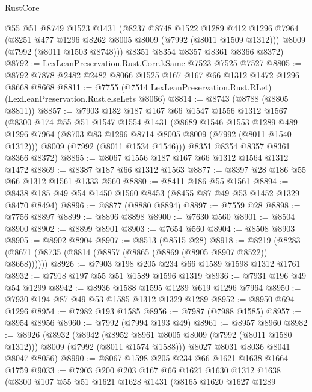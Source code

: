 \begin{lexlean}{RustCore}
\begin{coremodule}
      @55
      @51
      @8749
      @1523
      @1431
      (@8237
        @8748
        @1522
        @1289
        @412
        @1296
        @7964
        (@8251 @477 @1296 @8262 @8005 @8009 (@7992 (@8011 @1509 @1312)))
        @8009
        (@7992 (@8011 @1503 @8748)))
      @8351
      @8354
      @8357
      @8361
      @8366
      @8372)
@8792 := LexLeanPreservation.Rust.Corr.kSame @7523 @7525 @7527
@8805 := @8792 @7878 @2482 @2482 @8066 @1525 @167 @167 @66 @1312 @1472 @1296 @8668 @8668
@8811 := @7755 (@7514 LexLeanPreservation.Rust.RLet) (LexLeanPreservation.Rust.elseLets @8066)
@8814 := @8743 (@8788 (@8805 @8811))
@8857 := @7903
    @182
    @187
    @167
    @66
    @1547
    @1556
    @1312
    @1567
    (@8300
      @174
      @55
      @51
      @1547
      @1554
      @1431
      (@8689
        @1546
        @1553
        @1289
        @489
        @1296
        @7964
        (@8703 @83 @1296 @8714 @8005 @8009 (@7992 (@8011 @1540 @1312)))
        @8009
        (@7992 (@8011 @1534 @1546)))
      @8351
      @8354
      @8357
      @8361
      @8366
      @8372)
@8865 := @8067 @1556 @187 @167 @66 @1312 @1564 @1312 @1472
@8869 := @8387 @187 @66 @1312 @1563
@8877 := @8397 @28 @186 @55 @66 @1312 @1561 @1333 @560
@8880 := @8411 @186 @55 @1561
@8894 := @8438 @185 @49 @54 @1450 @1560 @8453 (@8455 @87 @49 @53 @1452 @1329 @8470 @8494)
@8896 := @8877 (@8880 @8894)
@8897 := @7559 @28
@8898 := @7756 @8897
@8899 := @8896 @8898
@8900 := @7630 @560
@8901 := @8504 @8900
@8902 := @8899 @8901
@8903 := @7654 @560
@8904 := @8508 @8903
@8905 := @8902 @8904
@8907 := @8513 (@8515 @28)
@8918 := @8219 (@8283 (@8671 (@8735 (@8814 (@8857 (@8865 (@8869 (@8905 @8907 @8522)) @8668))))))
@8926 := @7903 @198 @205 @234 @66 @1589 @1598 @1312 @1761
@8932 := @7918 @197 @55 @51 @1589 @1596 @1319
@8936 := @7931 @196 @49 @54 @1299
@8942 := @8936 @1588 @1595 @1289 @619 @1296 @7964
@8950 := @7930 @194 @87 @49 @53 @1585 @1312 @1329 @1289
@8952 := @8950 @694 @1296
@8954 := @7982 @193 @1585
@8956 := @7987 (@7988 @1585)
@8957 := @8954 @8956
@8960 := @7992 (@7994 @193 @49)
@8961 := @8957 @8960
@8982 := @8926
    (@8932
      (@8942
        (@8952 @8961 @8005 @8009 (@7992 (@8011 @1580 @1312)))
        @8009
        (@7992 (@8011 @1574 @1588)))
      @8027
      @8031
      @8036
      @8041
      @8047
      @8056)
@8990 := @8067 @1598 @205 @234 @66 @1621 @1638 @1664 @1759
@9033 := @7903
    @200
    @203
    @167
    @66
    @1621
    @1630
    @1312
    @1638
    (@8300
      @107
      @55
      @51
      @1621
      @1628
      @1431
      (@8165
        @1620
        @1627
        @1289

\end{coremodule}
\end{lexlean}
